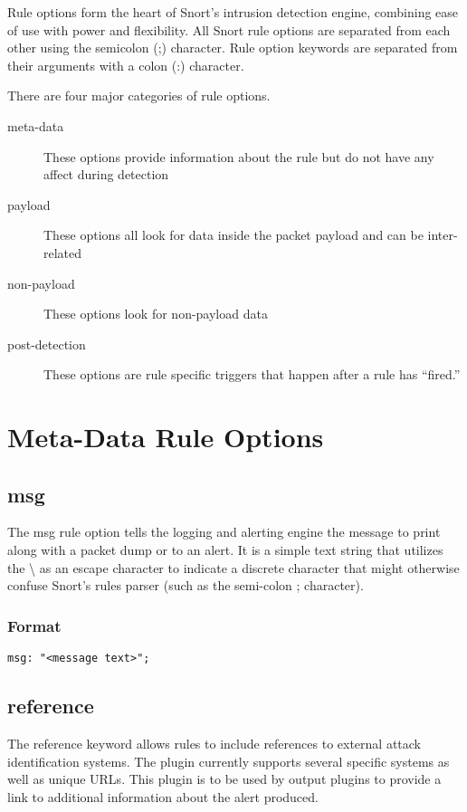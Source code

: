 \documentclass[english]{report}
\begin{document}
Rule options form the heart of Snort's intrusion detection engine, combining
ease of use with power and flexibility. All Snort rule options are separated
from each other using the semicolon (;) character. Rule option keywords are
separated from their arguments with a colon (:) character. 

There are four major categories of rule options.  
\begin{description}
\item [meta-data] These options provide information about the rule but do not have any affect during detection 
\item [payload] These options all look for data inside the packet payload and can be inter-related
\item [non-payload] These options look for non-payload data
\item [post-detection] These options are rule specific triggers that happen after a rule has ``fired.''
\end{description}

\section{Meta-Data Rule Options}

\subsection{msg}

The msg rule option tells the logging and alerting engine the message to print
along with a packet dump or to an alert. It is a simple text string that
utilizes the \textbackslash{} as an escape character to indicate a discrete
character that might otherwise confuse Snort's rules parser (such as the
semi-colon ; character).

\subsubsection{Format}

\begin{verbatim}
msg: "<message text>";
\end{verbatim}

\subsection{reference}

The reference keyword allows rules to include references to external
attack identification systems. The plugin currently supports several
specific systems as well as unique URLs. This plugin is to be used
by output plugins to provide a link to additional information about
the alert produced.
\end{document}

